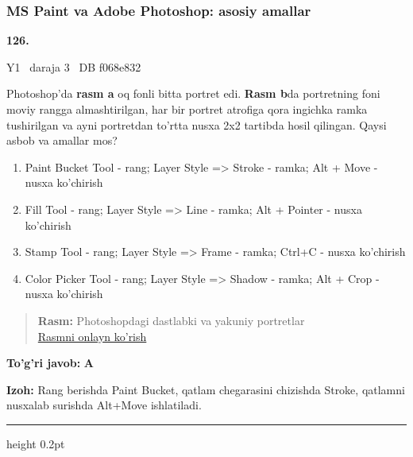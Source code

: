 \documentclass[10pt,a4paper,oneside]{article}
\begin{document}
\subsubsection{MS Paint va Adobe Photoshop: asosiy amallar}
\hypertarget{q126}{\textbf{\color{ink}126.}}  {\color{muted}\scriptsize Y1 \textbullet\ daraja 3 \textbullet\ DB f068e832}
\par
Photoshop'da \textbf{rasm a} oq fonli bitta portret edi. \textbf{Rasm b}da portretning foni moviy rangga almashtirilgan, har bir portret atrofiga qora ingichka ramka tushirilgan va ayni portretdan to'rtta nusxa 2x2 tartibda hosil qilingan. Qaysi asbob va amallar mos?
\begin{enumerate}[label=\Alph*),leftmargin=9mm]
\item Paint Bucket Tool - rang; Layer Style =\textgreater{} Stroke - ramka; Alt + Move - nusxa ko'chirish
\item Fill Tool - rang; Layer Style =\textgreater{} Line - ramka; Alt + Pointer - nusxa ko'chirish
\item Stamp Tool - rang; Layer Style =\textgreater{} Frame - ramka; Ctrl+C - nusxa ko'chirish
\item Color Picker Tool - rang; Layer Style =\textgreater{} Shadow - ramka; Alt + Crop - nusxa ko'chirish
\end{enumerate}
\begin{quote}\footnotesize\color{muted}\textbf{Rasm:} Photoshopdagi dastlabki va yakuniy portretlar\\
\href{https://github.com/sarvar9417/attestatsiya/blob/main/public/kuzgi-demo/demo_q17_photoshop.svg}{Rasmni onlayn ko'rish}
\end{quote}
\begin{tcolorbox}[enhanced,breakable,colback=teal!4,colframe=teal!45!black,boxrule=0.45pt,arc=1.2mm,left=2.8mm,right=2.8mm,top=2mm,bottom=2mm,before skip=2mm,after skip=2mm]
\textbf{\color{teal}To'g'ri javob:} \textbf{A}
\par\smallskip
\textbf{Izoh:} Rang berishda Paint Bucket, qatlam chegarasini chizishda Stroke, qatlamni nusxalab surishda Alt+Move ishlatiladi.
\end{tcolorbox}
\vspace{2mm}\hrule height 0.2pt \vspace{4mm}
\end{document}
